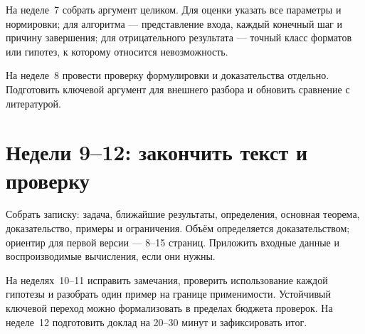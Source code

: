 На неделе~7 собрать аргумент целиком. Для оценки указать все параметры
и нормировки; для алгоритма --- представление входа, каждый конечный
шаг и причину завершения; для отрицательного результата --- точный класс
форматов или гипотез, к которому относится невозможность.

На неделе~8 провести проверку формулировки и доказательства отдельно.
Подготовить ключевой аргумент для внешнего разбора и обновить сравнение
с литературой.


\section{Недели 9--12: закончить текст и проверку}
Собрать записку: задача, ближайшие результаты, определения, основная
теорема, доказательство, примеры и ограничения. Объём определяется
доказательством; ориентир для первой версии --- 8--15 страниц.
Приложить входные данные и воспроизводимые вычисления, если они нужны.

На неделях~10--11 исправить замечания, проверить использование каждой
гипотезы и разобрать один пример на границе применимости. Устойчивый
ключевой переход можно формализовать в пределах бюджета проверок.
На неделе~12 подготовить доклад на 20--30 минут и зафиксировать итог.


